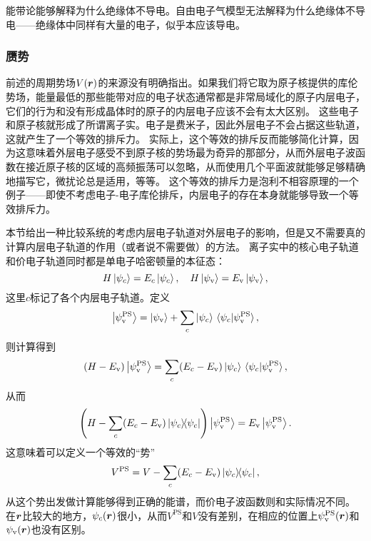 能带论能够解释为什么绝缘体不导电。自由电子气模型无法解释为什么绝缘体不导电——绝缘体中同样有大量的电子，似乎本应该导电。

\subsubsection{赝势}\label{sec:pseudopotential}

前述的周期势场$V(\vb*{r})$的来源没有明确指出。如果我们将它取为原子核提供的库伦势场，能量最低的那些能带对应的电子状态通常都是非常局域化的原子内层电子，它们的行为和没有形成晶体时的原子的内层电子应该不会有太大区别。
这些电子和原子核就形成了所谓离子实。电子是费米子，因此外层电子不会占据这些轨道，这就产生了一个等效的排斥力。
实际上，这个等效的排斥反而能够简化计算，因为这意味着外层电子感受不到原子核的势场最为奇异的那部分，从而外层电子波函数在接近原子核的区域的高频振荡可以忽略，从而使用几个平面波就能够足够精确地描写它，微扰论总是适用，等等。
这个等效的排斥力是泡利不相容原理的一个例子——即使不考虑电子-电子库伦排斥，内层电子的存在本身就能够导致一个等效排斥力。

本节给出一种比较系统的考虑内层电子轨道对外层电子的影响，但是又不需要真的计算内层电子轨道的作用（或者说不需要做）的方法。
离子实中的核心电子轨道和价电子轨道同时都是单电子哈密顿量的本征态：
\begin{equation}
    H \ket{\psi_c} = E_c \ket{\psi_c}, \quad H \ket{\psi_\text{v}} = E_\text{v} \ket{\psi_\text{v}},
\end{equation}
这里$c$标记了各个内层电子轨道。定义
\begin{equation}
    \ket{\psi_\text{v}^\text{PS}} = \ket{\psi_\text{v}} + \sum_c \ket{\psi_c} \braket*{\psi_c}{\psi_\text{v}^\text{PS}},
\end{equation}
则计算得到
\[
    (H - E_\text{v}) \ket{\psi_\text{v}^\text{PS}} = \sum_c (E_c - E_\text{v}) \ket{\psi_c} \braket*{\psi_c}{\psi_\text{v}^\text{PS}},
\]
从而
\begin{equation}
    \left(H - \sum_c (E_c - E_\text{v}) \dyad*{\psi_c}\right) \ket{\psi_\text{v}^\text{PS}} = E_\text{v} \ket{\psi_\text{v}^\text{PS}}.
    \label{eq:original-pseudopotential}
\end{equation}
这意味着可以定义一个等效的“势”
\begin{equation}
    V^\text{PS} = V - \sum_c (E_c - E_\text{v}) \dyad*{\psi_c},
\end{equation}
从这个势出发做计算能够得到正确的能谱，而价电子波函数则和实际情况不同。
在$\vb*{r}$比较大的地方，$\psi_c(\vb*{r})$很小，从而$V^\text{PS}$和$V$没有差别，在相应的位置上$\psi_\text{v}^\text{PS}(\vb*{r})$和$\psi_\text{v}(\vb*{r})$也没有区别。

